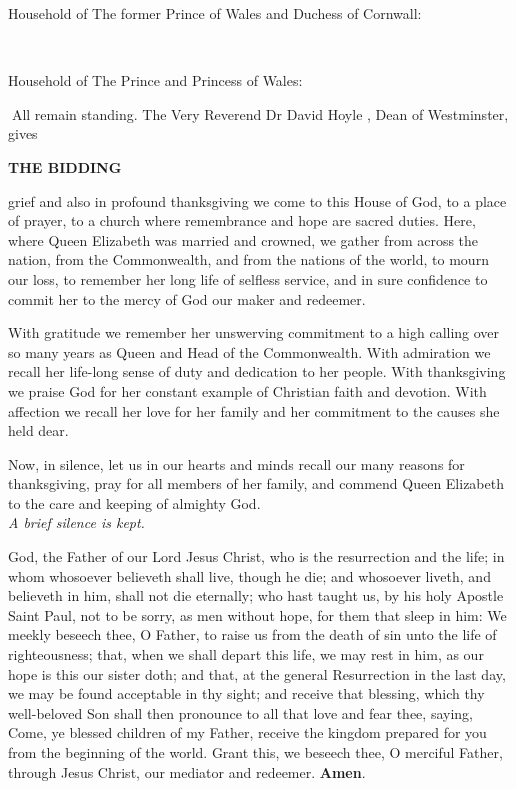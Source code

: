 Household of The former Prince of Wales and Duchess of Cornwall:

\\

Household of The Prince and Princess of Wales:

All remain standing. The Very Reverend Dr David Hoyle , Dean of Westminster, gives

\begin{center}
\normalfont\bfseries{} THE BIDDING
\end{center}


\color{black}\normalfont
{}  grief and also in profound thanksgiving we come to this House of God, to a place
of prayer, to a church where remembrance and hope are sacred duties. Here, where
Queen Elizabeth was married and crowned, we gather from across the nation, from the
Commonwealth, and from the nations of the world, to mourn our loss, to remember
her long life of selfless service, and in sure confidence to commit her to the mercy of
God our maker and redeemer.

With gratitude we remember her unswerving commitment to a high calling over so
many years as Queen and Head of the Commonwealth. With admiration we recall her
life-long sense of duty and dedication to her people. With thanksgiving we praise God
for her constant example of Christian faith and devotion. With affection we recall her
love for her family and her commitment to the causes she held dear.


Now, in silence, let us in our hearts and minds recall our many reasons for thanksgiving,
pray for all members of her family, and commend Queen Elizabeth to the care and
keeping of almighty God.\\\itshape\color{qred}
A brief silence is kept.

\color{black}\normalfont{} God, the Father of our Lord Jesus Christ, who is the resurrection
and the life; in whom whosoever believeth shall live, though he die; and
whosoever liveth, and believeth in him, shall not die eternally; who hast taught us, by
his holy Apostle Saint Paul, not to be sorry, as men without hope, for them that sleep
in him: We meekly beseech thee, O Father, to raise us from the death of sin unto the
life of righteousness; that, when we shall depart this life, we may rest in him, as our
hope is this our sister doth; and that, at the general Resurrection in the last day, we may
be found acceptable in thy sight; and receive that blessing, which thy well-beloved Son
shall then pronounce to all that love and fear thee, saying, Come, ye blessed children of
my Father, receive the kingdom prepared for you from the beginning of the world.
Grant this, we beseech thee, O merciful Father, through Jesus Christ, our mediator and
redeemer. \textbf{Amen}.

